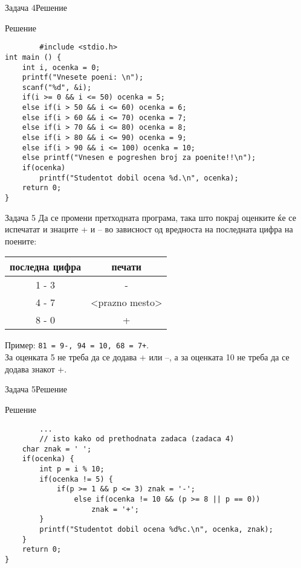 \begin{frame}[fragile]{Задача 4}{Решение}
\begin{exampleblock}{Решение}
		\begin{lstlisting}
		#include <stdio.h>
int main () { 
    int i, ocenka = 0;
    printf("Vnesete poeni: \n");
    scanf("%d", &i);
    if(i >= 0 && i <= 50) ocenka = 5;
    else if(i > 50 && i <= 60) ocenka = 6;
    else if(i > 60 && i <= 70) ocenka = 7;
    else if(i > 70 && i <= 80) ocenka = 8;
    else if(i > 80 && i <= 90) ocenka = 9;
    else if(i > 90 && i <= 100) ocenka = 10;
    else printf("Vnesen e pogreshen broj za poenite!!\n"); 
    if(ocenka) 
        printf("Studentot dobil ocena %d.\n", ocenka);
    return 0;
}
		\end{lstlisting}
	\end{exampleblock}
\end{frame}

\begin{frame}[fragile]{Задача 5}
Да се промени претходната програма, така што покрај оценките ќе се испечатат и знаците + и – во зависност од вредноста на последната цифра на поените:
\begin{center}
\begin{tabular}{|c|c|}
\hline \textbf{последна цифра} & \textbf{печати} \\ 
\hline 1 - 3 & - \\ 
\hline 4 - 7 & <prazno mesto> \\ 
\hline 8 - 0 & + \\ 
\hline 
\end{tabular} 
\end{center}
Пример: \texttt{81 = 9-, 94 = 10, 68 = 7+}.\\ 
За оценката 5 не треба да се додава + или –, а за оценката 10 не треба да се додава знакот +.
\end{frame}


\begin{frame}[fragile]{Задача 5}{Решение}
	\begin{exampleblock}{Решение}
		\begin{lstlisting}
		... 
		// isto kako od prethodnata zadaca (zadaca 4)
    char znak = ' ';
    if(ocenka) {
        int p = i % 10;
        if(ocenka != 5) {
            if(p >= 1 && p <= 3) znak = '-';
                else if(ocenka != 10 && (p >= 8 || p == 0)) 
                    znak = '+';
        }
    	printf("Studentot dobil ocena %d%c.\n", ocenka, znak);
    }
    return 0;
}
		\end{lstlisting}
	\end{exampleblock}
\end{frame}


